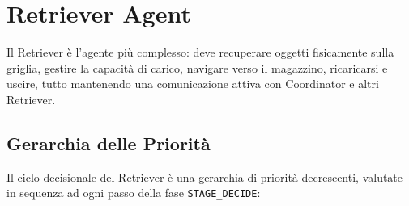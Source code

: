 \chapter{Retriever Agent}

Il Retriever \`e l'agente pi\`u complesso: deve recuperare oggetti fisicamente sulla griglia,
gestire la capacit\`a di carico, navigare verso il magazzino, ricaricarsi e uscire, tutto
mantenendo una comunicazione attiva con Coordinator e altri Retriever.

\section{Gerarchia delle Priorit\`a}

Il ciclo decisionale del Retriever \`e una gerarchia di priorit\`a decrescenti, valutate
in sequenza ad ogni passo della fase \texttt{STAGE\_DECIDE}:

